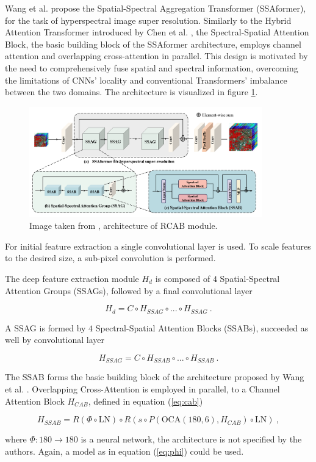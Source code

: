 Wang et al. \cite{wangSSAformerSpatialSpectral2024} propose the Spatial-Spectral Aggregation Transformer (SSAformer),
for the task of hyperspectral image super resolution.
Similarly to the Hybrid Attention Transformer introduced by Chen et al. \cite{chenHATHybridAttention2024},
the Spectral-Spatial Attention Block, 
the basic building block of the SSAformer architecture,
employs channel attention and overlapping cross-attention in parallel.
This design is motivated by the need to comprehensively fuse spatial and spectral information, 
overcoming the limitations of CNNs’ locality and conventional Transformers’ imbalance between the two domains.
The architecture is visualized in figure \ref{fig:ssaformer}.

\begin{figure}[h!]
    \includegraphics[width=0.9\textwidth]{models/hsisr/imgs/ssaformer.png}
    \caption{Image taken from \cite{zhangImageSuperResolutionUsing2018}, architecture of RCAB module.}
    \label{fig:ssaformer}
\end{figure}

For initial feature extraction a single convolutional layer is used.
To scale features to the desired size, a sub-pixel convolution is performed.

\noindent The deep feature extraction module $H_d$ is composed of $4$ Spatial-Spectral Attention Groups (SSAGs),
followed by a final convolutional layer

    $$ H_d = C \circ H_{SSAG} \circ ... \circ H_{SSAG} ~. $$

A SSAG is formed by $4$ Spectral-Spatial Attention Blocks (SSABs), succeeded as well by convolutional layer

    $$ H_{SSAG} = C \circ H_{SSAB} \circ ... \circ H_{SSAB} ~.$$

The SSAB forms the basic building block of the architecture proposed by Wang et al. \cite{wangSSAformerSpatialSpectral2024}.
Overlapping Cross-Attention is employed in parallel,
to a Channel Attention Block $H_{CAB}$, defined in equation (\ref{eq:cab})

    $$ H_{SSAB} = R(\Phi \circ \text{LN}) \circ R(s \circ P( \text{OCA}(180, 6), H_{CAB}) \circ \text{LN}) ~, $$

where $\Phi:180 \to 180$ is a neural network, the architecture is not specified by the authors.
Again, a model as in equation (\ref{eq:phi}) could be used.